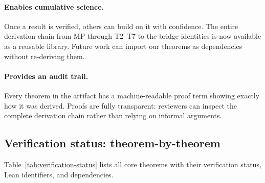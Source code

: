 \documentclass[11pt]{article}
\begin{document}
\paragraph{Enables cumulative science.} Once a result is verified, others can build on it with confidence. The entire derivation chain from MP through T2--T7 to the bridge identities is now available as a reusable library. Future work can import our theorems as dependencies without re-deriving them.

\paragraph{Provides an audit trail.} Every theorem in the artifact has a machine-readable proof term showing exactly how it was derived. Proofs are fully transparent: reviewers can inspect the complete derivation chain rather than relying on informal arguments.

\subsection{Verification status: theorem-by-theorem}

Table~\ref{tab:verification-status} lists all core theorems with their verification status, Lean identifiers, and dependencies.
\end{document}
